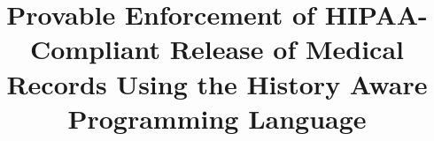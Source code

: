 \documentclass{sig-alternate-05-2015}
\begin{document}

\title{Provable Enforcement of HIPAA-Compliant Release of Medical Records Using the History Aware Programming Language}


\maketitle

\printccsdesc
\end{document}
